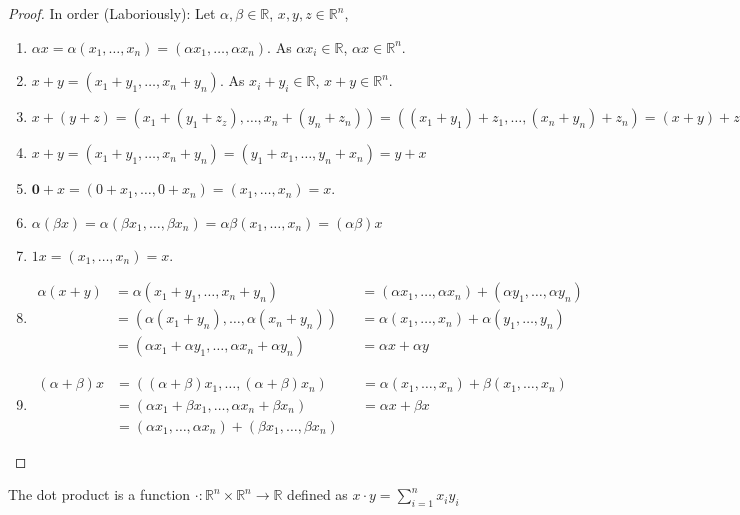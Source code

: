 \documentclass[crop=false,class=article,oneside]{standalone}
\begin{document}
        \begin{proof}
        In order (Laboriously): Let $\alpha, \beta \in \mathbb{R}$, $x,y,z\in \mathbb{R}^n$,
        \begin{enumerate}
        \item $\alpha x = \alpha(x_1,\hdots,x_n) = (\alpha x_1,\hdots, \alpha x_n)$. As $\alpha x_i \in \mathbb{R}$, $\alpha x \in \mathbb{R}^n$.
        \item $x+y = (x_1+y_1,\hdots,x_n+y_n)$. As $x_i+y_i \in \mathbb{R}$, $x+y\in \mathbb{R}^n$.
        \item $x+(y+z) = (x_1+(y_1+z_z),\hdots, x_n+(y_n+z_n)) = ((x_1+y_1)+z_1,\hdots, (x_n+y_n)+z_n) = (x+y)+z$
        \item $x+y = (x_1+y_1,\hdots,x_n+y_n) = (y_1+x_1,\hdots, y_n+x_n)=y+x$
        \item $\mathbf{0}+x = (0+x_1,\hdots, 0+x_n) = (x_1,\hdots, x_n) = x$.
        \item $\alpha(\beta x) = \alpha(\beta x_1,\hdots, \beta x_n) = \alpha \beta (x_1,\hdots, x_n) = (\alpha \beta) x$
        \item $1 x = (x_1,\hdots, x_n) = x$.
        \item
            \begin{align*}
                \alpha(x+y) &= \alpha(x_1+y_1,\hdots, x_n+y_n) & &= (\alpha x_1, \hdots, \alpha x_n) + (\alpha y_1,\hdots, \alpha y_n)\\
                &= (\alpha(x_1+y_n),\hdots, \alpha(x_n+y_n)) & &= \alpha(x_1,\hdots, x_n)+\alpha(y_1,\hdots, y_n)\\
                &= (\alpha x_1+\alpha y_1,\hdots, \alpha x_n + \alpha y_n) & &= \alpha x + \alpha y
            \end{align*} 
        \item
            \begin{align*}
                (\alpha + \beta)x &= ((\alpha+\beta)x_1,\hdots, (\alpha+\beta)x_n) & &= \alpha (x_1, \hdots, x_n)+\beta (x_1, \hdots, x_n)\\
                &= (\alpha x_1 + \beta x_1,\hdots, \alpha x_n + \beta x_n) & &= \alpha x+\beta x\\
                &= (\alpha x_1,\hdots, \alpha x_n) + (\beta x_1,\hdots, \beta x_n)
            \end{align*}
        \end{enumerate}
        \end{proof}
        \begin{definition}
        The dot product is a function $\cdot:\mathbb{R}^n \times \mathbb{R}^n \rightarrow \mathbb{R}$ defined as $x\cdot y = \sum_{i=1}^{n} x_iy_i$
        \end{definition}
\end{document}

